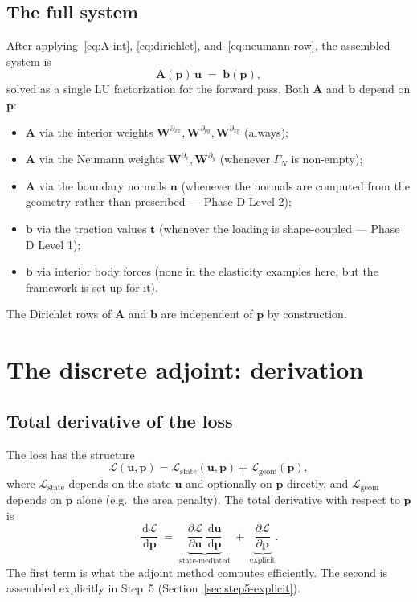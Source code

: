 \documentclass[11pt,a4paper]{article}
\newcommand{\mat}[1]{\mathbf{#1}}
\newcommand{\vect}[1]{\boldsymbol{#1}}
\newcommand{\pts}{\vect{p}}
\newcommand{\dd}{\,\mathrm{d}}
\newcommand{\Loss}{\mathcal{L}}
\begin{document}
\subsection{The full system}

After applying~\eqref{eq:A-int}, \eqref{eq:dirichlet},
and~\eqref{eq:neumann-row}, the assembled system is
\begin{equation}
  \mat A(\pts)\, \vect u \;=\; \vect b(\pts),
  \label{eq:system}
\end{equation}
solved as a single LU factorization for the forward pass. Both
$\mat A$ and $\vect b$ depend on $\pts$:
\begin{itemize}[leftmargin=2em]
  \item $\mat A$ via the interior weights
        $\mat W^{\partial_{xx}}, \mat W^{\partial_{yy}},
        \mat W^{\partial_{xy}}$ (always);
  \item $\mat A$ via the Neumann weights
        $\mat W^{\partial_x}, \mat W^{\partial_y}$ (whenever
        $\Gamma_N$ is non-empty);
  \item $\mat A$ via the boundary normals $\vect n$ (whenever the
        normals are computed from the geometry rather than
        prescribed --- Phase D Level 2);
  \item $\vect b$ via the traction values $\vect t$ (whenever the
        loading is shape-coupled --- Phase D Level 1);
  \item $\vect b$ via interior body forces (none in the elasticity
        examples here, but the framework is set up for it).
\end{itemize}
The Dirichlet rows of $\mat A$ and $\vect b$ are independent of
$\pts$ by construction.

\section{The discrete adjoint: derivation}
\label{sec:adjoint-theory}

\subsection{Total derivative of the loss}

The loss has the structure
\begin{equation}
  \Loss(\vect u, \pts)
  = \Loss_{\text{state}}(\vect u, \pts) + \Loss_{\text{geom}}(\pts),
\end{equation}
where $\Loss_{\text{state}}$ depends on the state $\vect u$ and
optionally on $\pts$ directly, and $\Loss_{\text{geom}}$ depends on
$\pts$ alone (e.g.\ the area penalty). The total derivative with
respect to $\pts$ is
\begin{equation}
  \frac{\dd\Loss}{\dd\pts}
  \;=\;
  \underbrace{\frac{\partial\Loss}{\partial\vect u}\,
    \frac{\dd\vect u}{\dd\pts}}_{\text{state-mediated}}
  \;+\;
  \underbrace{\frac{\partial\Loss}{\partial\pts}}_{\text{explicit}}.
  \label{eq:total-deriv}
\end{equation}
The first term is what the adjoint method computes efficiently. The
second is assembled explicitly in Step~5
(Section~\ref{sec:step5-explicit}).
\end{document}
